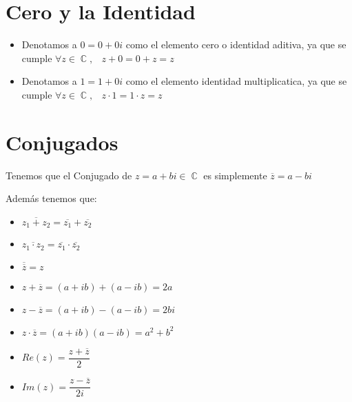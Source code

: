 \documentclass[12pt, fleqn]{report}                             %
\DeclareMathOperator \Space {\quad}                             %
\DeclareMathOperator \MiniSpace {\;}                            %
\DeclareMathOperator \Complexs  {\mathbb{C}}                     %
\begin{document}
        \clearpage
        \section{Cero y la Identidad}

            \begin{itemize}
                \item Denotamos a $0 = 0 + 0i$ como el elemento cero o identidad aditiva, ya que se cumple 
                        $\forall z \in \Complexs, \MiniSpace z + 0 = 0 + z = z$

                \item Denotamos a $1 = 1 + 0i$ como el elemento identidad multiplicatica, ya que se cumple 
                        $\forall z \in \Complexs, \MiniSpace z \cdot 1 = 1 \cdot z = z$
            \end{itemize}

        \section{Conjugados}
            Tenemos que el Conjugado de $z = a+bi \in \Complexs$ es simplemente $\overline{z} = a-bi$

            Además tenemos que:
            \begin{itemize}
                \item $\overline{z_1 + z_2} = \overline{z_1} + \overline{z_2}$
                
                \item $\overline{z_1 \cdot z_2} = \overline{z_1} \cdot \overline{z_2}$
                
                \item $\overline{\overline{z}} = z$

                \item $z + \overline{z} = (a + ib) + (a - ib) = 2a$

                \item $z - \overline{z} = (a + ib) - (a - ib) = 2bi$
                
                \item $z \cdot \overline{z} = (a+ib)(a-ib) = a^2 + b^2$

                \item $Re(z) = \dfrac{z+\overline{z}}{2}$

                \item $Im(z) = \dfrac{z-\overline{z}}{2i}$
            \end{itemize}
\end{document}
